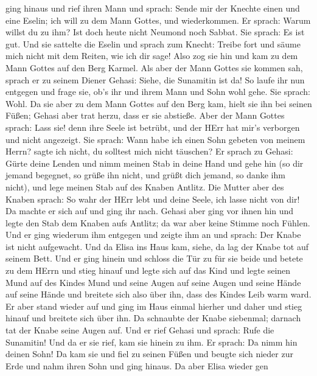 ging hinaus  und rief ihren Mann und sprach: Sende mir der
Knechte einen und eine Eselin; ich will zu dem Mann Gottes, und
wiederkommen.  Er sprach: Warum willst du zu ihm? Ist doch
heute nicht Neumond noch Sabbat. Sie sprach: Es ist gut. 
Und sie sattelte die Eselin und sprach zum Knecht: Treibe fort und säume
mich nicht mit dem Reiten, wie ich dir sage!  Also zog sie
hin und kam zu dem Mann Gottes auf den Berg Karmel. Als aber der Mann
Gottes sie kommen sah, sprach er zu seinem Diener Gehasi: Siehe, die
Sunamitin ist da!  So laufe ihr nun entgegen und frage sie,
ob's ihr und ihrem Mann und Sohn wohl gehe. Sie sprach: Wohl.
 Da sie aber zu dem Mann Gottes auf den Berg kam, hielt sie
ihn bei seinen Füßen; Gehasi aber trat herzu, dass er sie abstieße. Aber
der Mann Gottes sprach: Lass sie! denn ihre Seele ist betrübt, und der
HErr hat mir's verborgen und nicht angezeigt.  Sie sprach:
Wann habe ich einen Sohn gebeten von meinem Herrn? sagte ich nicht, du
solltest mich nicht täuschen?  Er sprach zu Gehasi: Gürte
deine Lenden und nimm meinen Stab in deine Hand und gehe hin (so dir
jemand begegnet, so grüße ihn nicht, und grüßt dich jemand, so danke ihm
nicht), und lege meinen Stab auf des Knaben Antlitz.  Die
Mutter aber des Knaben sprach: So wahr der HErr lebt und deine Seele,
ich lasse nicht von dir! Da machte er sich auf und ging ihr nach.
 Gehasi aber ging vor ihnen hin und legte den Stab dem
Knaben aufs Antlitz; da war aber keine Stimme noch Fühlen. Und er ging
wiederum ihm entgegen und zeigte ihm an und sprach: Der Knabe ist nicht
aufgewacht.  Und da Elisa ins Haus kam, siehe, da lag der
Knabe tot auf seinem Bett.  Und er ging hinein und schloss
die Tür zu für sie beide und betete zu dem HErrn  und stieg
hinauf und legte sich auf das Kind und legte seinen Mund auf des Kindes
Mund und seine Augen auf seine Augen und seine Hände auf seine Hände und
breitete sich also über ihn, dass des Kindes Leib warm ward.
 Er aber stand wieder auf und ging im Haus einmal hierher
und daher und stieg hinauf und breitete sich über ihn. Da schnaubte der
Knabe siebenmal; darnach tat der Knabe seine Augen auf. 
Und er rief Gehasi und sprach: Rufe die Sunamitin! Und da er sie rief,
kam sie hinein zu ihm. Er sprach: Da nimm hin deinen Sohn! 
Da kam sie und fiel zu seinen Füßen und beugte sich nieder zur Erde und
nahm ihren Sohn und ging hinaus.  Da aber Elisa wieder gen
